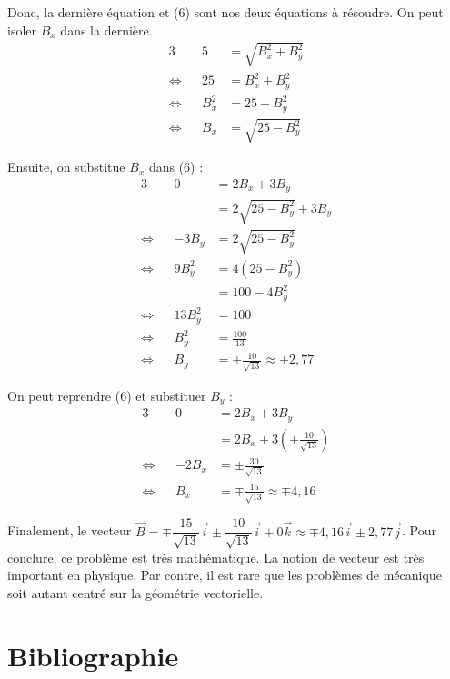 \documentclass[11pt]{article}
\begin{document}
Donc, la dernière équation et (6) sont nos deux équations à résoudre. On peut isoler $B_x$ dans la dernière.
\begin{alignat*}{3}
                & &     5 &= \sqrt{B_x^2+B_y^2}\\
\Leftrightarrow & &    25 &= B_x^2+B_y^2\\
\Leftrightarrow & & B_x^2 &= 25-B_y^2\\
\Leftrightarrow & &   B_x &= \sqrt{25-B_y^2}
\end{alignat*}
\pagebreak

Ensuite, on substitue $B_x$ dans (6) :
\begin{alignat*}{3}
                & &       0 &= 2B_x+3B_y\\
                & &         &= 2\sqrt{25-B_y^2}+3B_y\\
\Leftrightarrow & &   -3B_y &= 2\sqrt{25-B_y^2}\\
\Leftrightarrow & &  9B_y^2 &= 4(25-B_y^2)\\
                & &         &= 100-4B_y^2\\
\Leftrightarrow & & 13B_y^2 &= 100\\
\Leftrightarrow & &   B_y^2 &= \frac{100}{13}\\
\Leftrightarrow & &     B_y &= \pm\frac{10}{\sqrt{13}}\approx\pm2,77
\end{alignat*}

On peut reprendre (6) et substituer $B_y$ :
\begin{alignat*}{3}
                & &     0 &= 2B_x+3B_y\\
                & &       &= 2B_x+3\left(\pm\frac{10}{\sqrt{13}}\right)\\
\Leftrightarrow & & -2B_x &= \pm\frac{30}{\sqrt{13}}\\
\Leftrightarrow & &   B_x &= \mp\frac{15}{\sqrt{13}}\approx\mp4,16
\end{alignat*}

Finalement, le vecteur $\vec{B}=\mp\dfrac{15}{\sqrt{13}}\vec{i}\pm\dfrac{10}{\sqrt{13}}\vec{i}+0\vec{k}\approx\mp4,16\vec{i}\pm2,77\vec{j}$. Pour conclure, ce problème est très mathématique. La notion de vecteur est très important en physique. Par contre, il est rare que les problèmes de mécanique soit autant centré sur la géométrie vectorielle.
\section*{Bibliographie}

\renewcommand{\section}[2]{}

\end{document}
